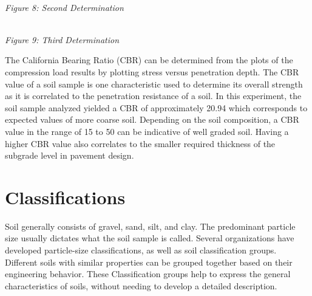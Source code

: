 \documentclass{article}
\begin{document}
\begin{center}
    \vspace{3mm}
    \emph{\\Figure 8: Second Determination\\}
    \vspace{5mm}
    \pgfplotsset{width=10cm}
    \vspace{3mm}
    \emph{\\Figure 9: Third Determination}
\end{center}
\par The California Bearing Ratio (CBR) can be determined from the plots of the compression load results by plotting stress versus penetration depth. The CBR value of a soil sample is one characteristic used to determine its overall strength as it is correlated to the penetration resistance of a soil. In this experiment, the soil sample analyzed yielded a CBR of approximately 20.94 which corresponds to expected values of more coarse soil. Depending on the soil composition, a CBR value in the range of 15 to 50 can be indicative of well graded soil. Having a higher CBR value also correlates to the smaller required thickness of the subgrade level in pavement design. 
\newpage
\section{Classifications}
\par Soil generally consists of gravel, sand, silt, and clay. The predominant particle size usually dictates what the soil sample is called. Several organizations have developed particle-size classifications, as well as soil classification groups. Different soils with similar properties can be grouped together based on their engineering behavior. These Classification groups help to express the general characteristics of soils, without needing to develop a detailed description.  
\end{document}
